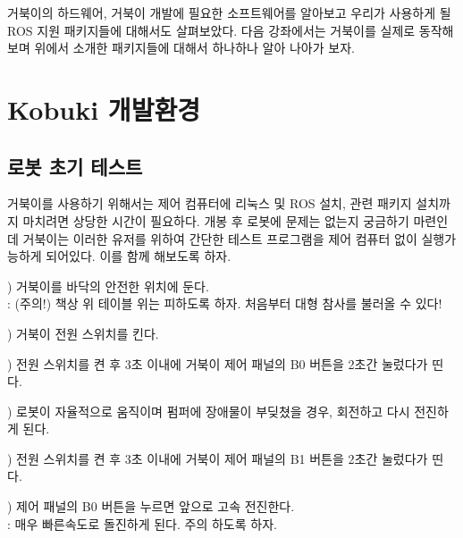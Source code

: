 \vspace{\baselineskip}
\noindent
거북이의 하드웨어, 거북이 개발에 필요한 소프트웨어를 알아보고 우리가 사용하게 될 ROS 지원 패키지들에 대해서도 살펴보았다. 다음 강좌에서는 거북이를 실제로 동작해보며 위에서 소개한 패키지들에 대해서 하나하나 알아 나아가 보자.

\section{Kobuki 개발환경}

\subsection{로봇 초기 테스트}

거북이를 사용하기 위해서는 제어 컴퓨터에 리눅스 및 ROS 설치, 관련 패키지 설치까지 마치려면 상당한 시간이 필요하다. 개봉 후 로봇에 문제는 없는지 궁금하기 마련인데 거북이는 이러한 유저를 위하여 간단한 테스트 프로그램을 제어 컴퓨터 없이 실행가능하게 되어있다. 이를 함께 해보도록 하자. 

\setcounter{num}{0}

\vspace{\baselineskip}
\noindent{}
\thenum) 거북이를 바닥의 안전한 위치에 둔다.\\
: (주의!) 책상 위 테이블 위는 피하도록 하자. 처음부터 대형 참사를 불러올 수 있다!

\vspace{\baselineskip}
\noindent{}
\thenum) 거북이 전원 스위치를 킨다. 

\vspace{\baselineskip}
\noindent{}
\thenum) 전원 스위치를 켠 후 3초 이내에 거북이 제어 패널의 B0 버튼을 2초간 눌렀다가 띤다.

\vspace{\baselineskip}
\noindent{}
\thenum) 로봇이 자율적으로 움직이며 펌퍼에 장애물이 부딪쳤을 경우, 회전하고 다시 전진하게 된다.

\vspace{\baselineskip}
\noindent{}
\thenum)  전원 스위치를 켠 후 3초 이내에 거북이 제어 패널의 B1 버튼을 2초간 눌렀다가 띤다.

\vspace{\baselineskip}
\noindent{}
\thenum)  제어 패널의 B0 버튼을 누르면 앞으로 고속 전진한다.\\
: 매우 빠른속도로 돌진하게 된다. 주의 하도록 하자.

